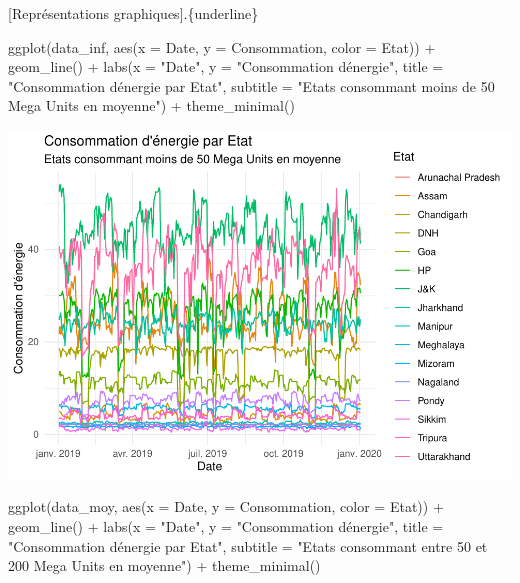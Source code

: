 \documentclass[
]{article}
\newenvironment{Shaded}{\begin{snugshade}}{\end{snugshade}}
\newcommand{\AttributeTok}[1]{\textcolor[rgb]{0.77,0.63,0.00}{#1}}
\newcommand{\FunctionTok}[1]{\textcolor[rgb]{0.00,0.00,0.00}{#1}}
\newcommand{\NormalTok}[1]{#1}
\newcommand{\SpecialCharTok}[1]{\textcolor[rgb]{0.00,0.00,0.00}{#1}}
\newcommand{\StringTok}[1]{\textcolor[rgb]{0.31,0.60,0.02}{#1}}
\begin{document}
{[}Représentations graphiques{]}.\{underline\}

\begin{Shaded}
\begin{Highlighting}[]
\FunctionTok{ggplot}\NormalTok{(data\_inf, }\FunctionTok{aes}\NormalTok{(}\AttributeTok{x =}\NormalTok{ Date, }\AttributeTok{y =}\NormalTok{ Consommation, }\AttributeTok{color =}\NormalTok{ Etat)) }\SpecialCharTok{+}
  \FunctionTok{geom\_line}\NormalTok{() }\SpecialCharTok{+}
  \FunctionTok{labs}\NormalTok{(}\AttributeTok{x =} \StringTok{"Date"}\NormalTok{, }\AttributeTok{y =} \StringTok{"Consommation d\textquotesingle{}énergie"}\NormalTok{, }
       \AttributeTok{title =} \StringTok{"Consommation d\textquotesingle{}énergie par Etat"}\NormalTok{, }
       \AttributeTok{subtitle =} \StringTok{"Etats consommant moins de 50 Mega Units en moyenne"}\NormalTok{) }\SpecialCharTok{+}
  \FunctionTok{theme\_minimal}\NormalTok{()}
\end{Highlighting}
\end{Shaded}

\includegraphics{Projet_CHESNAIS_GUIBERT_files/figure-latex/unnamed-chunk-12-1.pdf}

\begin{Shaded}
\begin{Highlighting}[]
\FunctionTok{ggplot}\NormalTok{(data\_moy, }\FunctionTok{aes}\NormalTok{(}\AttributeTok{x =}\NormalTok{ Date, }\AttributeTok{y =}\NormalTok{ Consommation, }\AttributeTok{color =}\NormalTok{ Etat)) }\SpecialCharTok{+}
  \FunctionTok{geom\_line}\NormalTok{() }\SpecialCharTok{+}
  \FunctionTok{labs}\NormalTok{(}\AttributeTok{x =} \StringTok{"Date"}\NormalTok{, }\AttributeTok{y =} \StringTok{"Consommation d\textquotesingle{}énergie"}\NormalTok{, }
       \AttributeTok{title =} \StringTok{"Consommation d\textquotesingle{}énergie par Etat"}\NormalTok{, }
       \AttributeTok{subtitle =} \StringTok{"Etats consommant entre 50 et 200 Mega Units en moyenne"}\NormalTok{) }\SpecialCharTok{+}
  \FunctionTok{theme\_minimal}\NormalTok{()}
\end{Highlighting}
\end{Shaded}
\end{document}
